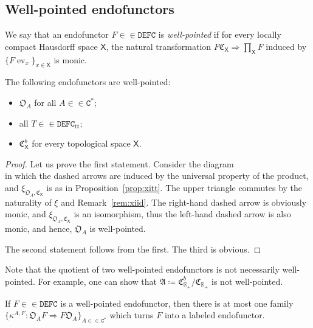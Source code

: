 \documentclass[10pt]{simplearticle}
\newcommand{\tikzinput}[1]{}
\newcommand{\ev}{\operatorname{ev}}
\newcommand{\DEFC}{\mathbb{\mathtt{DEFC}}}
\newcommand{\Cstar}{\mathtt{C^{*}}}
\newcommand{\C}{\mathfrak{C}^{\,}}
\newcommand{\ttt}{\operatorname{tt}}
\begin{document}
\subsection{Well-pointed endofunctors}
\begin{defn}
We say that an endofunctor $F\in\in\DEFC$ is \emph{well-pointed}
if for every locally compact Hausdorff space $\mathsf{X}$, the natural
transformation $F\C_{\mathsf{X}}\Rightarrow\prod_{\mathsf{X}}F$ induced
by $\{F\ev_{x}\}_{x\in\mathsf{X}}$ is monic.
\end{defn}

\begin{lem}\label{lem:OA-wp}
The following endofunctors are well-pointed:
\begin{itemize}
\item $\mathfrak{O}_{A}$ for all $A\in\in\Cstar$;
\item all $T\in\in\DEFC_{\ttt}$;
\item $\mathfrak{C}^{b}_{\mathsf{X}}$ for every topological space $\mathsf{X}$.
\end{itemize}
\end{lem}

\begin{proof}
Let us prove the first statement. Consider the diagram
\[
\tikzinput{d430}
\]
in which the dashed arrows are induced by the universal property of
the product, and $\xi_{\mathfrak{O}_{A},\C_{\mathsf{X}}}$ is as in
Proposition~\ref{prop:xitt}. The upper triangle commutes by the
naturality of $\xi$ and Remark~\ref{rem:xiid}. The right-hand dashed
arrow is obviously monic, and $\xi_{\mathfrak{O}_{A},\C_{\mathsf{X}}}$
is an isomorphism, thus the left-hand dashed arrow is also monic,
and hence, $\mathfrak{O}_{A}$ is well-pointed.

The second statement follows from the first. The third is obvious.
\end{proof}

\begin{rem}
Note that the quotient of two well-pointed endofunctors is not necessarily
well-pointed. For example, one can show that $\mathfrak{A}\coloneqq\mathfrak{C}^{b}_{\mathbb{R}_{+}}/\C_{\mathbb{R}_{+}}$
is not well-pointed.
\end{rem}

\begin{prop}\label{prop:unique-labeling}
If $F\in\in\DEFC$ is a well-pointed
endofunctor, then there is at most one family $\{\kappa^{A,F}\colon\mathfrak{O}_{A}F\Rightarrow F\mathfrak{O}_{A}\}_{A\in\in\Cstar}$
which turns $F$ into a labeled endofunctor.
\end{prop}
\end{document}
